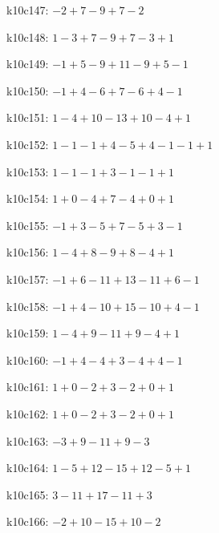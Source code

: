k10c147: $ -2+7-9+7-2 $ 

k10c148: $ 1-3+7-9+7-3+1 $ 

k10c149: $ -1+5-9+11-9+5-1 $ 

k10c150: $ -1+4-6+7-6+4-1 $ 

k10c151: $ 1-4+10-13+10-4+1 $ 

k10c152: $ 1-1-1+4-5+4-1-1+1 $ 

k10c153: $ 1-1-1+3-1-1+1 $ 

k10c154: $ 1+0-4+7-4+0+1 $ 

k10c155: $ -1+3-5+7-5+3-1 $ 

k10c156: $ 1-4+8-9+8-4+1 $ 

k10c157: $ -1+6-11+13-11+6-1 $ 

k10c158: $ -1+4-10+15-10+4-1 $ 

k10c159: $ 1-4+9-11+9-4+1 $ 

k10c160: $ -1+4-4+3-4+4-1 $ 

k10c161: $ 1+0-2+3-2+0+1 $ 

k10c162: $ 1+0-2+3-2+0+1 $ 

k10c163: $ -3+9-11+9-3 $ 

k10c164: $ 1-5+12-15+12-5+1 $ 

k10c165: $ 3-11+17-11+3 $ 

k10c166: $ -2+10-15+10-2 $ 

